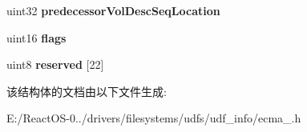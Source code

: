 \begin{DoxyCompactItemize}
\item 
\mbox{\label{struct_primary_vol_desc_a0787ca452bd1f9b23238399d447ac433}} 
uint32 {\bfseries predecessor\+Vol\+Desc\+Seq\+Location}
\item 
\mbox{\label{struct_primary_vol_desc_a7e76a48dc59bc34e9d92832c28594c5e}} 
uint16 {\bfseries flags}
\item 
\mbox{\label{struct_primary_vol_desc_a37b6b5eff67e3f52fdd9909b5e113fd2}} 
uint8 {\bfseries reserved} \mbox{[}22\mbox{]}
\end{DoxyCompactItemize}


该结构体的文档由以下文件生成\+:\begin{DoxyCompactItemize}
\item 
E\+:/\+React\+O\+S-\/0../drivers/filesystems/udfs/udf\+\_\+info/ecma\+\_.\+h\end{DoxyCompactItemize}
